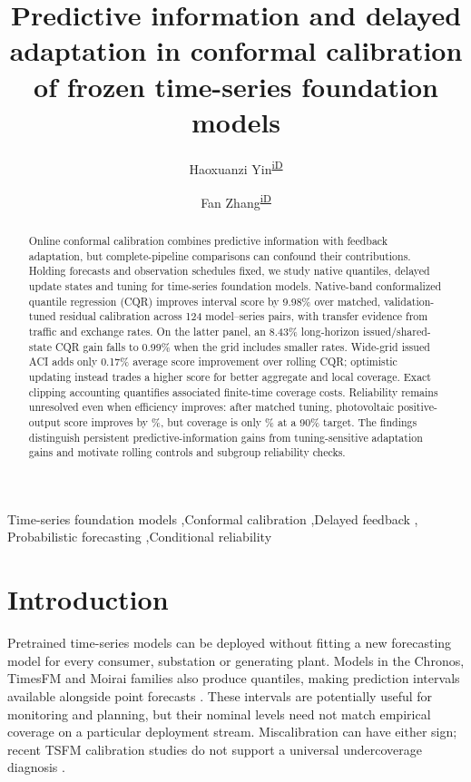 \documentclass[preprint,11pt]{elsarticle}
\begin{document}
\begin{frontmatter}
\title{Predictive information and delayed adaptation in conformal calibration of frozen time-series foundation models}
\author[a]{Haoxuanzi Yin\textsuperscript{\href{https://orcid.org/0009-0001-1166-2216}{iD}}}
\author[b]{Fan Zhang\textsuperscript{\href{https://orcid.org/0009-0004-3509-7495}{iD}}}
\begin{abstract}
Online conformal calibration combines predictive information with feedback adaptation,
but complete-pipeline comparisons can confound their contributions. Holding forecasts
and observation schedules fixed, we study native quantiles, delayed update states and
tuning for time-series foundation models. Native-band conformalized quantile regression
(CQR) improves interval score by 9.98\% over matched, validation-tuned residual calibration
across 124 model--series pairs, with transfer evidence from traffic and exchange rates.
On the latter panel, an 8.43\% long-horizon issued/shared-state CQR gain falls to 0.99\%
when the grid includes smaller rates. Wide-grid issued ACI adds only 0.17\% average
score improvement over rolling CQR; optimistic updating instead trades a higher score
for better aggregate and local coverage. Exact clipping accounting quantifies associated
finite-time coverage costs. Reliability remains unresolved even when efficiency improves:
after matched tuning, photovoltaic positive-output score improves by
\PVTunedPositiveGain\%, but coverage is only \PVTunedPositiveCoverage\% at a 90\% target.
The findings distinguish persistent predictive-information gains from tuning-sensitive
adaptation gains and motivate rolling controls and subgroup reliability checks.

\end{abstract}
\begin{keyword}
Time-series foundation models \sep Conformal calibration \sep Delayed feedback \sep
Probabilistic forecasting \sep Conditional reliability
\end{keyword}
\end{frontmatter}

\section{Introduction}
Pretrained time-series models can be deployed without fitting a new forecasting model
for every consumer, substation or generating plant. Models in the Chronos, TimesFM and
Moirai families also produce quantiles, making prediction intervals available alongside
point forecasts \citep{ansari2024chronos,das2024timesfm,ansari2025chronos2,liu2025moirai2}.
These intervals are potentially useful for monitoring and planning, but their nominal
levels need not match empirical coverage on a particular deployment stream. Miscalibration
can have either sign; recent TSFM calibration studies do not support a universal
undercoverage diagnosis \citep{adler2025calibration}.
\end{document}
